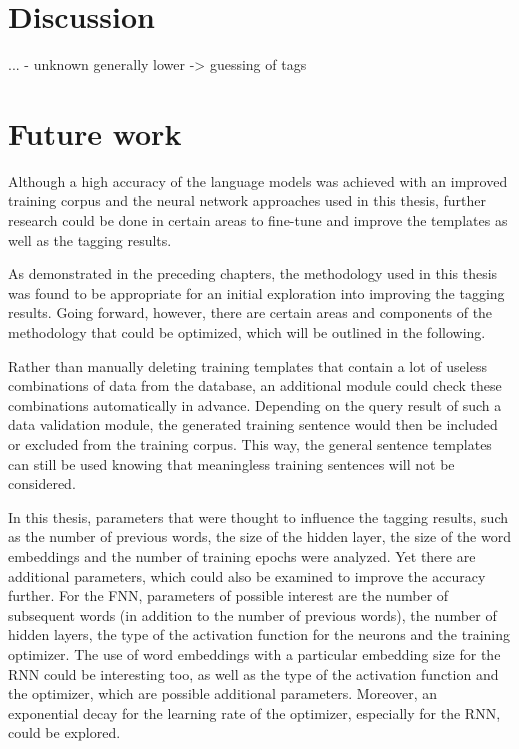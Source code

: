 \section{Discussion}\label{c.conclusion.discussion}
...
- unknown generally lower -> guessing of tags

\section{Future work}\label{c.conclusion.future}
Although a high accuracy of the language models was achieved with an improved training corpus and the neural network approaches used in this thesis, further research could be done in certain areas to fine-tune and improve the templates as well as the tagging results.

As demonstrated in the preceding chapters, the methodology used in this thesis was found to be appropriate for an initial exploration into improving the tagging results. Going forward, however, there are certain areas and components of the methodology that could be optimized, which will be outlined in the following.

Rather than manually deleting training templates that contain a lot of useless combinations of data from the database, an additional module could check these combinations automatically in advance. Depending on the query result of such a data validation module, the generated training sentence would then be included or excluded from the training corpus. This way, the general sentence templates can still be used knowing that meaningless training sentences will not be considered.

In this thesis, parameters that were thought to influence the tagging results, such as the number of previous words, the size of the hidden layer, the size of the word embeddings and the number of training epochs were analyzed. Yet there are additional parameters, which could also be examined to improve the accuracy further. For the FNN, parameters of possible interest are the number of subsequent words (in addition to the number of previous words), the number of hidden layers, the type of the activation function for the neurons and the training optimizer. The use of word embeddings with a particular embedding size for the RNN could be interesting too, as well as the type of the activation function and the optimizer, which are possible additional parameters. Moreover, an exponential decay for the learning rate of the optimizer, especially for the RNN, could be explored.

